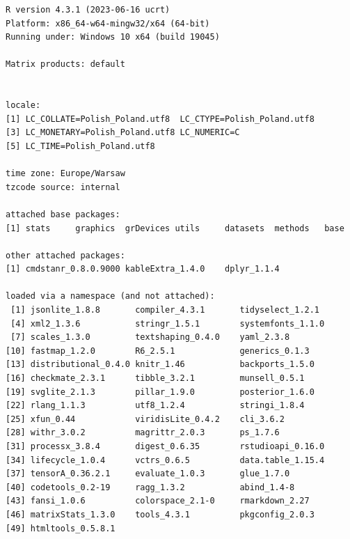 \documentclass[
]{article}
\begin{document}
\begin{verbatim}
R version 4.3.1 (2023-06-16 ucrt)
Platform: x86_64-w64-mingw32/x64 (64-bit)
Running under: Windows 10 x64 (build 19045)

Matrix products: default


locale:
[1] LC_COLLATE=Polish_Poland.utf8  LC_CTYPE=Polish_Poland.utf8   
[3] LC_MONETARY=Polish_Poland.utf8 LC_NUMERIC=C                  
[5] LC_TIME=Polish_Poland.utf8    

time zone: Europe/Warsaw
tzcode source: internal

attached base packages:
[1] stats     graphics  grDevices utils     datasets  methods   base     

other attached packages:
[1] cmdstanr_0.8.0.9000 kableExtra_1.4.0    dplyr_1.1.4        

loaded via a namespace (and not attached):
 [1] jsonlite_1.8.8       compiler_4.3.1       tidyselect_1.2.1    
 [4] xml2_1.3.6           stringr_1.5.1        systemfonts_1.1.0   
 [7] scales_1.3.0         textshaping_0.4.0    yaml_2.3.8          
[10] fastmap_1.2.0        R6_2.5.1             generics_0.1.3      
[13] distributional_0.4.0 knitr_1.46           backports_1.5.0     
[16] checkmate_2.3.1      tibble_3.2.1         munsell_0.5.1       
[19] svglite_2.1.3        pillar_1.9.0         posterior_1.6.0     
[22] rlang_1.1.3          utf8_1.2.4           stringi_1.8.4       
[25] xfun_0.44            viridisLite_0.4.2    cli_3.6.2           
[28] withr_3.0.2          magrittr_2.0.3       ps_1.7.6            
[31] processx_3.8.4       digest_0.6.35        rstudioapi_0.16.0   
[34] lifecycle_1.0.4      vctrs_0.6.5          data.table_1.15.4   
[37] tensorA_0.36.2.1     evaluate_1.0.3       glue_1.7.0          
[40] codetools_0.2-19     ragg_1.3.2           abind_1.4-8         
[43] fansi_1.0.6          colorspace_2.1-0     rmarkdown_2.27      
[46] matrixStats_1.3.0    tools_4.3.1          pkgconfig_2.0.3     
[49] htmltools_0.5.8.1   
\end{verbatim}
\end{document}
